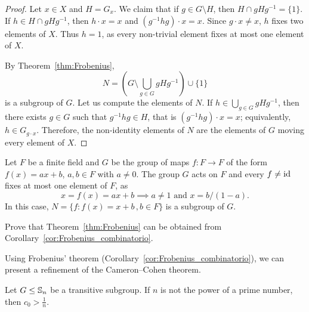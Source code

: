 \begin{proof}
  Let $x\in X$ and $H=G_x$. We claim that 
  if $g\in G\setminus H$, then $H\cap
  gHg^{-1}=\{1\}$. If $h\in H\cap gHg^{-1}$, then
  $h\cdot x=x$ and $(g^{-1}hg)\cdot
  x=x$. Since $g\cdot x\ne x$, $h$ fixes two elements of
  $X$. Thus 
  $h=1$, as every non-trivial element fixes at most one element of $X$. 

  By Theorem~\ref{thm:Frobenius}, 
  \[
    N=\left(G\setminus\bigcup_{g\in G}gHg^{-1}\right)\cup\{1\}
  \]
  is a subgroup of $G$. Let us compute the elements of $N$. If 
  $h\in\bigcup_{g\in G}gHg^{-1}$, then there exists  $g\in G$ such that $g^{-1}hg\in H$,
  that is $(g^{-1}hg)\cdot x=x$; equivalently, 
  $h\in G_{g\cdot x}$. Therefore, the 
  non-identity elements of $N$ are the elements of $G$
  moving every element of $X$.
\end{proof}

\begin{example}
  Let $F$ be a finite field and $G$ be the group of maps 
  $f\colon F\to F$ of the form 
  $f(x)=ax+b$, $a,b\in F$ with $a\ne0$. The group $G$ acts on 
  $F$ and every 
  $f\ne\operatorname{id}$ fixes at most one element of $F$, as 
  \[
	x=f(x)=ax+b\implies a\ne 1\text{ and } x=b/(1-a).
  \]
  In this case, $N=\{f:f(x)=x+b\,,b\in F\}$ 
  is a subgroup of $G$.
\end{example}

\begin{exercise}
    Prove that Theorem~\ref{thm:Frobenius} can be obtained from
    Corollary~\ref{cor:Frobenius_combinatorio}.
\end{exercise}

Using Frobenius’ theorem (Corollary~\ref{cor:Frobenius_combinatorio}), we can present a refinement of the Cameron–Cohen theorem.


\begin{theorem}
\label{thm:CameronCohen>1/n}
    Let $G\leq\mathbb{S}_n$ be a transitive subgroup. 
    If $n$ is not the power of a prime number, then
    $c_0>\frac{1}{n}$. 
\end{theorem}

